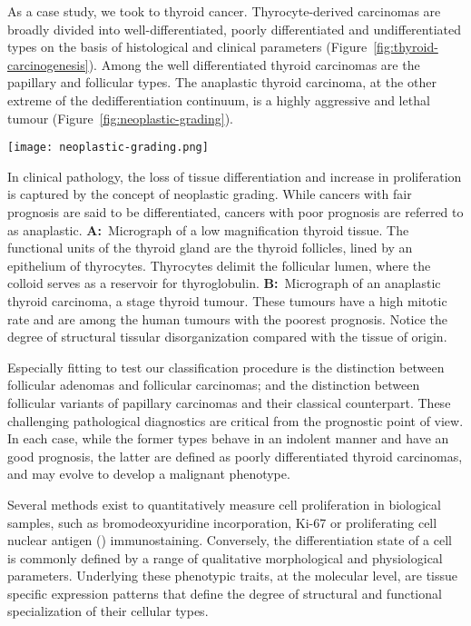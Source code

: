 As a case study, we took to thyroid cancer.  Thyrocyte-derived carcinomas are
broadly divided into well-differentiated, poorly differentiated and
undifferentiated types on the basis of histological and clinical parameters
(Figure~\ref{fig:thyroid-carcinogenesis}).\cite{kondo_pathogenetic_2006} Among
the well differentiated thyroid carcinomas are the papillary and follicular
types.  The anaplastic thyroid carcinoma, at the other extreme of the
dedifferentiation continuum, is a highly aggressive and lethal tumour
(Figure~\ref{fig:neoplastic-grading}).

\begin{marginfigure}
  \begin{center}
    \texttt{[image: neoplastic-grading.png]}
    \caption[Neoplastic grading]{In clinical pathology, the loss of tissue
      differentiation and increase in proliferation is captured by the concept
      of neoplastic grading.  While cancers with fair prognosis are said to be
      differentiated, cancers with poor prognosis are referred to as anaplastic.
      \textbf{A:}~Micrograph of a low magnification thyroid tissue.  The
      functional units of the thyroid gland are the thyroid follicles, lined by
      an epithelium of thyrocytes.  Thyrocytes delimit the follicular lumen,
      where the colloid serves as a reservoir for thyroglobulin.
      \textbf{B:}~Micrograph of an anaplastic thyroid carcinoma, a stage
       thyroid tumour.  These tumours have a high mitotic rate and
      are among the human tumours with the poorest prognosis.  Notice the degree
      of structural tissular disorganization compared with the tissue of
      origin.}
    \label{fig:neoplastic-grading}%
  \end{center}
\end{marginfigure}

Especially fitting to test our classification procedure is the distinction
between follicular adenomas and follicular carcinomas; and the distinction
between follicular variants of papillary carcinomas and their classical
counterpart.  These challenging pathological
diagnostics\cite{lubitz_molecular_2005} are critical from the prognostic point
of view.  In each case, while the former types behave in an indolent manner and
have an good prognosis, the latter are defined as poorly differentiated thyroid
carcinomas, and may evolve to develop a malignant phenotype.

Several methods exist to quantitatively measure cell proliferation in biological
samples, such as bromodeoxyuridine incorporation, Ki-67 or proliferating cell
nuclear antigen () immunostaining.  Conversely, the
differentiation state of a cell is commonly defined by a range of qualitative
morphological and physiological parameters.  Underlying these phenotypic traits,
at the molecular level, are tissue specific expression patterns that define the
degree of structural and functional specialization of their cellular types.

